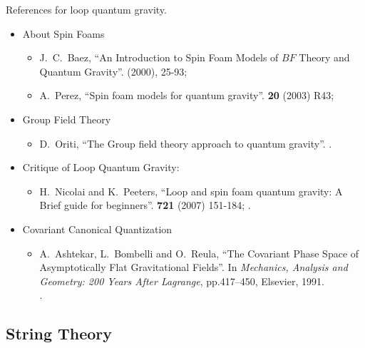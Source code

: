 \lecture

References for loop quantum gravity.
\begin{itemize}
\item About Spin Foams\begin{itemize}
\item J.~C.~Baez,
``An Introduction to Spin Foam Models of $BF$ Theory and Quantum Gravity''.
  (2000), 25-93;
\\
{\tt{}}
\item A.~Perez,
``Spin foam models for quantum gravity''.
 \textbf{20} (2003) R43;
\\
{\tt{}}
\end{itemize}
\item Group Field Theory
  \begin{itemize}
  \item D.~Oriti,
``The Group field theory approach to quantum gravity''.
.
  \end{itemize}
\item Critique of Loop Quantum Gravity:
  \begin{itemize}
  \item H.~Nicolai and K.~Peeters,
``Loop and spin foam quantum gravity: A Brief guide for beginners''.
 \textbf{721} (2007) 151-184;
.\\
{\tt{}}
  \end{itemize}
\item Covariant Canonical Quantization
  \begin{itemize}
  \item A.~Ashtekar, L.~Bombelli and O.~Reula,
``The Covariant Phase Space of Asymptotically Flat Gravitational Fields''.
In \textit{Mechanics, Analysis and Geometry: 200 Years After Lagrange},
pp.417--450, Elsevier, 1991. \\
{\tt{}}.
  \end{itemize}
\end{itemize}

\subsection{String Theory}

